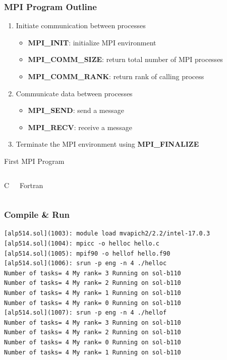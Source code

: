 \documentclass[10pt,t]{beamer}
\begin{document}
\begin{frame}
  \frametitle{MPI Program Outline}
  \begin{enumerate}
    \item Initiate communication between processes
      \begin{itemize}
        \item {\bf \textcolor{lubrown}{MPI\_INIT}}: initialize MPI environment
        \item {\bf MPI\_COMM\_SIZE}: return total number of MPI processes
        \item {\bf MPI\_COMM\_RANK}: return rank of calling process
      \end{itemize}
      \item Communicate data between processes
        \begin{itemize}
          \item {\bf MPI\_SEND}: send a message
          \item {\bf MPI\_RECV}: receive a message 
        \end{itemize}
      \item Terminate the MPI environment using \textbf{\textcolor{lubrown}{MPI\_FINALIZE}}
  \end{enumerate}
\end{frame}

\begin{frame}{First MPI Program}
  \begin{columns}
    \begin{exampleblock}{C}
      
    \end{exampleblock}
    \begin{exampleblock}{Fortran}
      
    \end{exampleblock}
  \end{columns}
\end{frame}

\begin{frame}[fragile]
  \frametitle{Compile \& Run}
  \begin{exampleblock}{}
    \begin{lstlisting}
[alp514.sol](1003): module load mvapich2/2.2/intel-17.0.3
[alp514.sol](1004): mpicc -o helloc hello.c
[alp514.sol](1005): mpif90 -o hellof hello.f90
[alp514.sol](1006): srun -p eng -n 4 ./helloc
Number of tasks= 4 My rank= 3 Running on sol-b110
Number of tasks= 4 My rank= 2 Running on sol-b110
Number of tasks= 4 My rank= 1 Running on sol-b110
Number of tasks= 4 My rank= 0 Running on sol-b110
[alp514.sol](1007): srun -p eng -n 4 ./hellof
Number of tasks= 4 My rank= 3 Running on sol-b110
Number of tasks= 4 My rank= 2 Running on sol-b110
Number of tasks= 4 My rank= 0 Running on sol-b110
Number of tasks= 4 My rank= 1 Running on sol-b110
    \end{lstlisting}
  \end{exampleblock}
\end{frame}
\end{document}
